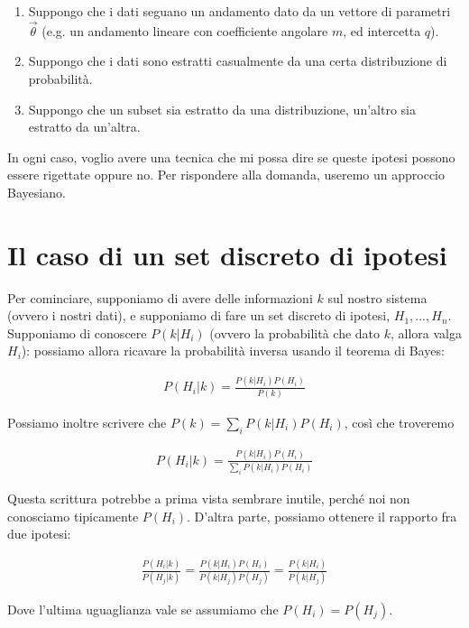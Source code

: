\documentclass{report}
\begin{document}
\begin{enumerate}
    \item  Suppongo che i dati seguano un andamento dato da un vettore di parametri \(\vec{\theta}\) (e.g. un andamento lineare con coefficiente angolare \(m\), ed intercetta \(q\)). 
    \item Suppongo che i dati sono estratti casualmente da una certa distribuzione di probabilità. 
    \item Suppongo che un subset sia estratto da una distribuzione, un'altro sia estratto da un'altra. 
\end{enumerate}

In ogni caso, voglio avere una tecnica che mi possa dire se queste ipotesi possono essere rigettate oppure no. Per rispondere alla domanda, useremo un approccio Bayesiano. 

\section{Il caso di un set discreto di ipotesi}

Per cominciare, supponiamo di avere delle informazioni \(k\) sul nostro sistema (ovvero i nostri dati), e supponiamo di fare un set discreto di ipotesi, \(H_1, ..., H_n\). \\

Supponiamo di conoscere \(P(k |H_i)\) (ovvero la probabilità che dato \(k\), allora valga \(H_i\)): possiamo allora ricavare la probabilità inversa usando il teorema di Bayes: 

\begin{align}
    P(H_i |k) = \frac{P(k|H_i)P(H_i)}{P(k)}
\end{align}

Possiamo inoltre scrivere che \(P(k) = \sum_i P(k |H_i)P(H_i)\), così che troveremo

\begin{align}
    P(H_i |k) = \frac{P(k|H_i)P(H_i)}{\sum_i P(k |H_i)P(H_i)}
\end{align}

Questa scrittura potrebbe a prima vista sembrare inutile, perché noi non conosciamo tipicamente \(P(H_i)\). D'altra parte, possiamo ottenere il rapporto fra due ipotesi: 

\begin{align}
    \frac{P(H_i|k)}{P(H_j |k)} = \frac{P(k|H_i)P(H_i)}{P(k|H_j)P(H_j)} = \frac{P(k|H_i)}{P(k|H_j)}
\end{align}

Dove l'ultima uguaglianza vale se assumiamo che \(P(H_i) = P(H_j)\). \\
\end{document}
